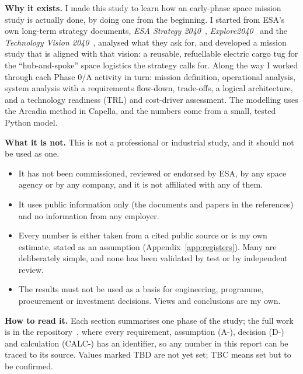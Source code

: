 \documentclass[11pt,a4paper]{article}
\newcommand{\id}[1]{#1}
\begin{document}
\textbf{Why it exists.} I made this study to learn how an early-phase space mission study is actually done, by doing one from the beginning. I started from ESA's own long-term strategy documents, \emph{ESA Strategy 2040}~\cite{strategy2040}, \emph{Explore2040}~\cite{explore2040} and the \emph{Technology Vision 2040}~\cite{techvision}, analysed what they ask for, and developed a mission study that is aligned with that vision: a reusable, refuellable electric cargo tug for the ``hub-and-spoke'' space logistics the strategy calls for. Along the way I worked through each Phase 0/A activity in turn: mission definition, operational analysis, system analysis with a requirements flow-down, trade-offs, a logical architecture, and a technology readiness (TRL) and cost-driver assessment. The modelling uses the Arcadia method in Capella, and the numbers come from a small, tested Python model.

\textbf{What it is not.} This is not a professional or industrial study, and it should not be used as one.
\begin{itemize}
  \item It has not been commissioned, reviewed or endorsed by ESA, by any space agency or by any company, and it is not affiliated with any of them.
  \item It uses public information only (the documents and papers in the references) and no information from any employer.
  \item Every number is either taken from a cited public source or is my own estimate, stated as an assumption (Appendix~\ref{app:registers}). Many are deliberately simple, and none has been validated by test or by independent review.
  \item The results must not be used as a basis for engineering, programme, procurement or investment decisions. Views and conclusions are my own.
\end{itemize}

\textbf{How to read it.} Each section summarises one phase of the study; the full work is in the repository~\cite{repo}, where every requirement, assumption (\id{A-}), decision (\id{D-}) and calculation (\id{CALC-}) has an identifier, so any number in this report can be traced to its source. Values marked TBD are not yet set; TBC means set but to be confirmed.
\end{document}
